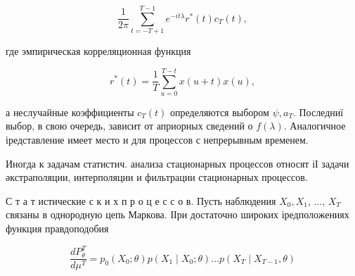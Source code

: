 \documentclass[10pt]{article}
\begin{document}
\[

\frac{1}{2 \pi} \sum_{t=-T+1}^{T-1} e^{-i t \lambda} r^{*}(t) c_{T}(t),

\]



где эмпирическая корреляционная функция



\[

r^{*}(t)=\frac{1}{T} \sum_{u=0}^{T-t} x(u+t) x(u),

\]



а неслучайные коэффициенты $c_{T}(t)$ определяются выбором $\psi, a_{T}$. Последниї выбор, в свою очередь, зависит от априорных сведений о $f(\lambda)$. Аналогичное іредставление имеет место и для процессов с непрерывным временем.



Иногда к задачам статистич. анализа стационарных процессов относят іІ задачи әкстраполяции, интерполяции и фильтрации стационарных процессов.



С т а т истические с к и х п р о ц е с с о в. Пусть наблюдения $X_{0}, X_{1}$, ..., $X_{T}$ связаны в однородную цепь Маркова. ІІри достаточно широких іредположениях функция правдоподобия



\[

\frac{d P_{\theta}^{T}}{d \mu^{T}}=p_{0}\left(X_{0} ; \theta\right) p\left(X_{1} \mid X_{0} ; \theta\right) \ldots p\left(X_{T} \mid X_{T-1}, \theta\right)

\]
\end{document}
